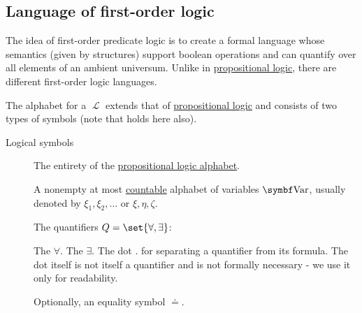 \subsection{Language of first-order logic}\label{subsec:language_of_first_order_logic}

\begin{definition}\label{def:first_order_language}\mcite\cite[187]{OpenLogic20201202}
  The idea of first-order predicate logic is to create a formal language whose semantics (given by structures) support boolean operations and can quantify over all elements of an ambient universum. Unlike in \hyperref[subsec:language_of_propositional_logic]{propositional logic}, there are different first-order logic languages.

  The alphabet for a  \( \mscrL \) extends that of \hyperref[subsec:language_of_propositional_logic]{propositional logic} and consists of two types of symbols (note that  holds here also).

  \begin{description}
    \item[Logical symbols]\mbox{}
    \begin{defenum}[series=def:first_order_language]
       The entirety of the \hyperref[subsec:language_of_propositional_logic]{propositional logic alphabet}.

       A nonempty at most \hyperref[rem:cardinals/countable]{countable} alphabet of variables \( \bfop{Var} \), usually denoted by \( \xi_1, \xi_2, \ldots \) or \( \xi, \eta, \zeta \).

       The quantifiers \( Q = \set{ \forall, \exists } \):
      \begin{defenum}
         The  \( \forall \).
         The  \( \exists \).
         The dot \( . \) for separating a quantifier from its formula. The dot itself is not itself a quantifier and is not formally necessary - we use it only for readability.
      \end{defenum}

       Optionally, an equality symbol \( \doteq \).
    \end{defenum}


\end{description}
\end{definition}
